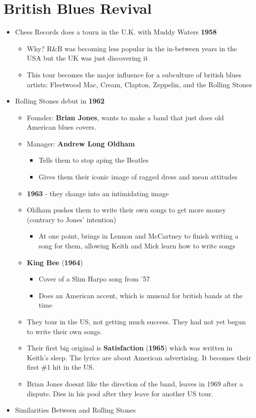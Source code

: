 \documentclass[11pt]{report}
\newcommand{\imp}[1]{\textbf{#1}}
\newcommand{\idate}[2]{\textcolor{blue!50}{\imp{#1}}\label{date:#2}}
\newcommand{\bl}{\begin{itemize}}
\newcommand{\kl}{\end{itemize}}
\newcommand{\song}[2]{\textcolor{red!70}{\textbf{#1}} (\idate{#2}{#1})}
\begin{document}
\section{British Blues Revival}
\begin{itemize}
	\item Chess Records does a tourn in the U.K. with Muddy Waters \idate{1958}{chess-records-tour}
	\bl
		\item Why? R\&B was becoming less popular in the in-between years in the USA but the UK was just discovering it
		\item This tour becomes the major influence for a subculture of british blues artists: Fleetwood Mac, Cream, Clapton, Zeppelin, and the Rolling Stones
	\kl
	\item Rolling Stones debut in \idate{1962}{rolling-stones-debut}
	\bl
		\item Founder: \textbf{Brian Jones}, wants to make a band that just does old American blues covers.
		\item Manager: \textbf{Andrew Long Oldham}
		\bl
			\item Tells them to stop aping the Beatles
			\item Gives them their iconic image of ragged dress and mean attitudes
		\kl
		\item \idate{1963}{rolling-stones-bad} - they change into an intimidating image
		\item Oldham pushes them to write their own songs to get more money (contrary to Jones' intention)
		\bl
			\item At one point, brings in Lennon and McCartney to finish writing a song for them, allowing Keith and Mick learn how to write songs
		\kl
		\item \song{King Bee}{1964}
		\bl
			\item Cover of a Slim Harpo song from '57
			\item Does an American accent, which is unusual for british bands at the time
		\kl
		\item They tour in the US, not getting much success. They had not yet begun to write their own songs.
		\item Their first big original is \song{Satisfaction}{1965} which was written in Keith's sleep. The lyrics are about American advertising. It becomes their first \#1 hit in the US.
		\item Brian Jones doesnt like the direction of the band, leaves in 1969 after a dispute. Dies in his pool after they leave for another US tour.
	\kl
	\item Similarities Between and Rolling Stones

\end{itemize}
\end{document}
